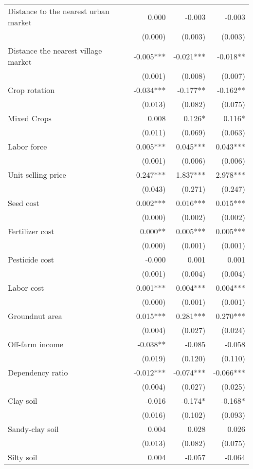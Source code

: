 \documentclass[
]{article}
\begin{document}
\begin{landscape}
\begin{longtable}[t]{lrrr}
\addlinespace
Distance to the nearest urban market & 0.000 & -0.003 & -0.003\\
 & (0.000) & (0.003) & (0.003)\\
Distance the nearest village market & -0.005*** & -0.021*** & -0.018**\\
 & (0.001) & (0.008) & (0.007)\\
Crop rotation & -0.034*** & -0.177** & -0.162**\\
\addlinespace
 & (0.013) & (0.082) & (0.075)\\
Mixed Crops & 0.008 & 0.126* & 0.116*\\
 & (0.011) & (0.069) & (0.063)\\
Labor force & 0.005*** & 0.045*** & 0.043***\\
 & (0.001) & (0.006) & (0.006)\\
\addlinespace
Unit selling price & 0.247*** & 1.837*** & 2.978***\\
 & (0.043) & (0.271) & (0.247)\\
Seed cost & 0.002*** & 0.016*** & 0.015***\\
 & (0.000) & (0.002) & (0.002)\\
Fertilizer cost & 0.000** & 0.005*** & 0.005***\\
\addlinespace
 & (0.000) & (0.001) & (0.001)\\
Pesticide cost & -0.000 & 0.001 & 0.001\\
 & (0.001) & (0.004) & (0.004)\\
Labor cost & 0.001*** & 0.004*** & 0.004***\\
 & (0.000) & (0.001) & (0.001)\\
\addlinespace
Groundnut area & 0.015*** & 0.281*** & 0.270***\\
 & (0.004) & (0.027) & (0.024)\\
Off-farm income & -0.038** & -0.085 & -0.058\\
 & (0.019) & (0.120) & (0.110)\\
Dependency ratio & -0.012*** & -0.074*** & -0.066***\\
\addlinespace
 & (0.004) & (0.027) & (0.025)\\
Clay soil & -0.016 & -0.174* & -0.168*\\
 & (0.016) & (0.102) & (0.093)\\
Sandy-clay soil & 0.004 & 0.028 & 0.026\\
 & (0.013) & (0.082) & (0.075)\\
\addlinespace
Silty soil & 0.004 & -0.057 & -0.064\\

\end{longtable}
\end{landscape}
\end{document}
